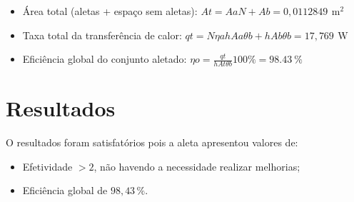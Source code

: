 \begin{itemize}[leftmargin=2cm]
    \item Área total (aletas + espaço sem aletas): \(
          {At}={{Aa}{N}+{Ab}} = {0,0112849}\,\SI{}{\square\meter}
          \)
    \item Taxa total da transferência de calor: \(
          {qt}=
          {{N}{{\eta}a}{h}{Aa}{{\theta}b}}+{{h}{Ab}{{\theta}b}}=
              {17,769\,\SI{}\watt}
          \)
    \item Eficiência global do conjunto aletado: \(
          {\eta}o=
          {\frac{qt}{{h}{At}{\theta}b}}{100\%}=
          {\SI{98,43}{\percent}}
          \)
\end{itemize}
\vspace{-0.6cm}
\section{
  Resultados
 }\label{sec:results}

O resultados foram satisfatórios pois a aleta apresentou valores de:
\vspace{-0.3cm}
\begin{itemize}[leftmargin=2cm]
    \vspace{-0.2cm}\item Efetividade \boldmath\(> 2\), não havendo a necessidade realizar melhorias;
    \vspace{-0.2cm}\item Eficiência global de \boldmath\(98,43\,\%\).
\end{itemize}